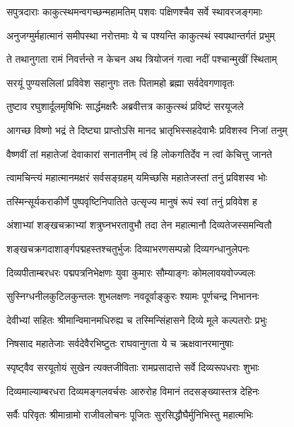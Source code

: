 \twolineshloka
{सपुत्रदाराः काकुत्स्थमन्वगच्छन्महामतिम्}
{पशवः पक्षिणश्चैव सर्वे स्थावरजङ्गमाः}%

\twolineshloka
{अनुजग्मुर्महात्मानं समीपस्था नरोत्तमाः}
{ये च पश्यन्ति काकुत्स्थं स्वपथान्तर्गतं प्रभुम्}%

\twolineshloka
{ते तथानुगता रामं निवर्त्तन्ते न केचन}
{अथ त्रियोजनं गत्वा नदीं पश्चान्मुखीं स्थिताम्}%

\twolineshloka
{सरयूं पुण्यसलिलां प्रविवेश सहानुगः}
{ततः पितामहो ब्रह्मा सर्वदेवगणावृतः}%

\twolineshloka
{तुष्टाव रघुशार्दूलमृषिभिः सार्द्धमक्षरैः}
{अब्रवीत्तत्र काकुत्स्थं प्रविष्टं सरयूजले}%


\twolineshloka
{आगच्छ विष्णो भद्रं ते दिष्ट्या प्राप्तोऽसि मानद}
{भ्रातृभिस्सहदेवाभैः प्रविशस्व निजां तनुम्}%

\twolineshloka
{वैष्णवीं तां महातेजां देवाकारां सनातनीम्}
{त्वं हि लोकगतिर्देव न त्वां केचित्तु जानते}%

\twolineshloka
{त्वामचिन्त्यं महात्मानमक्षरं सर्वसङ्ग्रहम्}
{यमिच्छसि महातेजस्तां तनुं प्रविशस्व भोः}%


\twolineshloka
{तस्मिन्सूर्यकराकीर्णे पुष्पवृष्टिनिपातिते}
{उत्सृज्य मानुषं रूपं स्वां तनुं प्रविवेश ह}%

\twolineshloka
{अंशाभ्यां शङ्खचक्राभ्यां शत्रुघ्नभरतावुभौ}
{तदा तेन महात्मानौ दिव्यतेजस्समन्वितौ}%

\twolineshloka
{शङ्खचक्रगदाशार्ङ्गपद्महस्तश्चतुर्भुजः}
{दिव्याभरणसम्पन्नो दिव्यगन्धानुलेपनः}%

\twolineshloka
{दिव्यपीताम्बरधरः पद्मपत्रनिभेक्षणः}
{युवा कुमारः सौम्याङ्गः कोमलावयवोज्ज्वलः}%

\twolineshloka
{सुस्निग्धनीलकुटिलकुन्तलः शुभलक्षणः}
{नवदूर्वाङ्कुरः श्यामः पूर्णचन्द्र निभाननः}%

\twolineshloka
{देवीभ्यां सहितः श्रीमान्विमानमधिरुह्य च}
{तस्मिन्सिंहासने दिव्ये मूले कल्पतरोः प्रभुः}%

\twolineshloka
{निषसाद महातेजाः सर्वदेवैरभिष्टुतः}
{राघवानुगता ये च ऋक्षवानरमानुषाः}%

\twolineshloka
{स्पृष्ट्वैव सरयूतोयं सुखेन त्यक्तजीविताः}
{रामप्रसादात्ते सर्वे दिव्यरूपधराः शुभाः}%

\twolineshloka
{दिव्यमाल्याम्बरधरा दिव्यमङ्गलवर्चसः}
{आरुरोह विमानं तदसङ्ख्यास्तत्र देहिनः}%

\twolineshloka
{सर्वैः परिवृतः श्रीमान्रामो राजीवलोचनः}
{पूजितः सुरसिद्धौघैर्मुनिभिस्तु महात्मभिः}%

